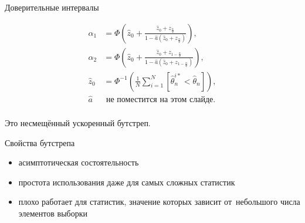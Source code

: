 \documentclass[9pt,pdf,utf8,hyperref={unicode},aspectratio=169]{beamer}
\begin{document}
\begin{frame}{Доверительные интервалы}
{\begin{itemize}
			\vspace{-10pt}
			
			\begin{align*}
			\alpha_1  &= \Phi\left(\hat{z}_0 + \frac{\hat{z}_0 + z_{\frac{\alpha}{2}}}{1 - \hat{a} \left(\hat{z}_0 + z_{\frac{\alpha}{2}}\right)}\right), \\
			\alpha_2  &= \Phi\left(\hat{z}_0 + \frac{\hat{z}_0 + z_{1-\frac{\alpha}{2}}}{1 - \hat{a} \left(\hat{z}_0 + z_{1-\frac{\alpha}{2}} \right)} \right), \\	
			\hat{z}_0 &= \Phi^{-1} \left(\frac1{N} \sum_{i=1}^N \left[ \hat{\theta}_n^{i*} < \hat{\theta}_n\right]\right), \\
			\hat{a}   & \text{ не поместится на этом слайде}.\\
			\end{align*}
			
			\vspace{-5pt}
			
			Это несмещённый ускоренный бутстреп.
		\end{itemize}
	}
\end{frame}

\begin{frame}{Свойства бутстрепа}
	\begin{itemize}
		\item асимптотическая состоятельность
		\item простота использования даже для самых сложных статистик
		\item плохо работает для статистик, значение которых зависит от~небольшого числа элементов выборки
	\end{itemize}
\end{frame}
\end{document}
